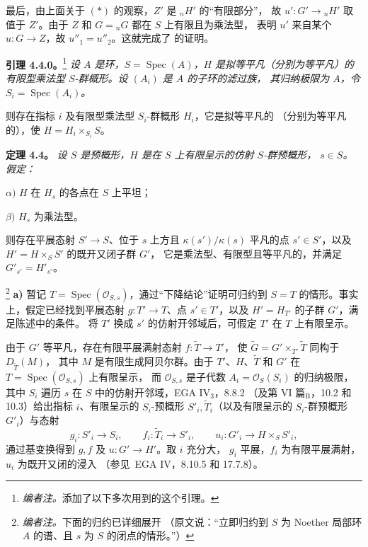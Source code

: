 最后，由上面关于 \((*)\) 的观察，\(Z'\) 是 \({}_nH'\) 的“有限部分”，
故 \(u':G'\to{}_nH'\) 取值于 \(Z'\)。由于 \(Z\) 和 \(G={}_nG\) 都在
\(S\) 上有限且为乘法型， 表明 \(u'\)
来自某个 \(u:G\to Z\)，故 \(u''_1=u''_2\)。这就完成了
 的证明。

\par\medskip\noindent
\textbf{引理 4.4.0。}\footnote{\textit{编者注。}添加了以下多次用到的这个引理。}\enspace
\begingroup\itshape
设 \(A\) 是环，\(S=\operatorname{Spec}(A)\)，\(H\) 是拟等平凡（分别为等平凡）的
有限型乘法型 \(S\)-群概形。设 \((A_i)\) 是 \(A\) 的子环的滤过族，
其归纳极限为 \(A\)，令 \(S_i=\operatorname{Spec}(A_i)\)。

则存在指标 \(i\) 及有限型乘法型 \(S_i\)-群概形 \(H_i\)，它是拟等平凡的
（分别为等平凡的），使 \(H=H_i\times_{S_i}S\)。
\par\endgroup

\par\medskip\noindent
\textbf{定理 4.4。}\enspace
\begingroup\itshape
设 \(S\) 是预概形，\(H\) 是在 \(S\) 上有限呈示的仿射 \(S\)-群预概形，
\(s\in S\)。假定：

\smallskip
\noindent
\(\alpha)\) \(H\) 在 \(H_s\) 的各点在 \(S\) 上平坦；

\smallskip
\noindent
\(\beta)\) \(H_s\) 为乘法型。

\smallskip
则存在平展态射 \(S'\to S\)、位于 \(s\) 上方且 \(\kappa(s')/\kappa(s)\)
平凡的点 \(s'\in S'\)，以及 \(H'=H\times_S S'\) 的既开又闭子群 \(G'\)，
它是乘法型、有限型且等平凡的，并满足 \(G'_{s'}=H'_{s'}\)。
\par\endgroup

\footnote{\textit{编者注。}下面的归约已详细展开
（原文说：“立即归约到 \(S\) 为 Noether 局部环 \(A\) 的谱、且 \(s\) 为 \(S\) 的闭点的情形。”）}
\noindent\textbf{a)}
暂记 \(T=\operatorname{Spec}(\mathcal O_{S,s})\)，通过“下降结论”证明可归约到
\(S=T\) 的情形。事实上，假定已经找到平展态射 \(g:T'\to T\)、点
\(s'\in T'\)，以及 \(H'=H_{T'}\) 的子群 \(G'\)，满足陈述中的条件。
将 \(T'\) 换成 \(s'\) 的仿射开邻域后，可假定 \(T'\) 在 \(T\) 上有限呈示。

由于 \(G'\) 等平凡，存在有限平展满射态射 \(f:\widetilde T\to T'\)，
使 \(\widetilde G=G'\times_{T'}\widetilde T\) 同构于 \(D_{\widetilde T}(M)\)，
其中 \(M\) 是有限生成阿贝尔群。由于 \(T'\)、\(H\)、\(\widetilde T\) 和
\(G'\) 在 \(T=\operatorname{Spec}(\mathcal O_{S,s})\) 上有限呈示，
而 \(\mathcal O_{S,s}\) 是子代数 \(A_i=\mathcal O_S(S_i)\) 的归纳极限，
其中 \(S_i\) 遍历 \(s\) 在 \(S\) 中的仿射开邻域，EGA IV\(_3\)，8.8.2
（及第 VI 篇\(_{\mathrm B}\)，10.2 和 10.3）给出指标 \(i\)、有限呈示的
\(S_i\)-预概形 \(S'_i,\widetilde T_i\)（以及有限呈示的 \(S_i\)-群预概形
\(G'_i\)）与态射
\[
  g_i:S'_i\to S_i,\qquad f_i:\widetilde T_i\to S'_i,
  \qquad
  u_i:G'_i\to H\times_S S'_i,
\]
通过基变换得到 \(g,f\) 及 \(u:G'\to H'\)。取 \(i\) 充分大，
\(g_i\) 平展，\(f_i\) 为有限平展满射，\(u_i\) 为既开又闭的浸入
（参见\ EGA IV，8.10.5 和 17.7.8）。

